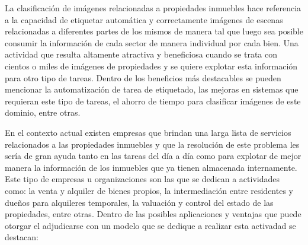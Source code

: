 La clasificación de imágenes relacionadas a propiedades inmuebles hace referencia a la capacidad de etiquetar automática y correctamente imágenes de escenas relacionadas a diferentes partes de los mismos de manera tal que luego sea posible consumir la información de cada sector de manera individual por cada bien. 
Una actividad que resulta altamente atractiva y beneficiosa cuando se trata con cientos o miles de imágenes de propiedades y se quiere explotar esta información para otro tipo de tareas. Dentro de los beneficios más destacables se pueden mencionar la automatización de tarea de etiquetado, las mejoras en sistemas que requieran este tipo de tareas, el ahorro de tiempo para clasificar imágenes de este dominio, entre otras.

En el contexto actual existen empresas que brindan una larga lista de servicios relacionados a las propiedades inmuebles y que la resolución de este problema les sería de gran ayuda tanto en las tareas del día a día como para explotar de mejor manera la información de los inmuebles que ya tienen almacenada internamente. Este tipo de empresas u organizaciones son las que se dedican a actividades como: la venta y alquiler de bienes propios, la intermediación entre residentes y dueños para alquileres temporales, la valuación y control del estado de las propiedades, entre otras.
Dentro de las posibles aplicaciones y ventajas que puede otorgar el adjudicarse con un modelo que se dedique a realizar esta activadad se destacan:
